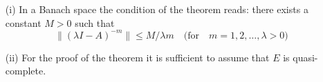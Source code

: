 \begin{remarks*}
\begin{itemize}
\item [(i)] In a Banach space the condition of the theorem reads: there exists a
constant $M>0$ such that 
$$
\parallel (\lambda I-A)^{-m}\parallel \leq M/\lambda m \quad
\text{(for}\quad m=1, 2,\ldots, \lambda >0\text{)}
$$
\item [(ii)] For the proof of the theorem it is sufficient to assume
  that $E$ is quasi-complete.
\end{itemize}
\end{remarks*}
